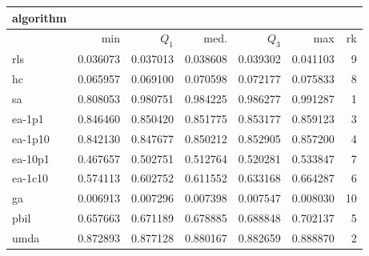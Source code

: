\begin{tabular}{@{}l*{5}{>{{}}N{1}{3}}>{{}}N{2}{0}@{}}
\toprule
{algorithm} &  \\
\midrule
& {min} & {$Q_1$} & {med.} & {$Q_3$} & {max} & {rk}\\
\midrule
rls & 0.036073 & 0.037013 & 0.038608 & 0.039302 & 0.041103 & 9\\
hc & 0.065957 & 0.069100 & 0.070598 & 0.072177 & 0.075833 & 8\\
sa & 0.808053 & {\color{blue}} 0.980751 & {\color{blue}} 0.984225 & {\color{blue}} 0.986277 & {\color{blue}} 0.991287 & 1\\
ea-1p1 & 0.846460 & 0.850420 & 0.851775 & 0.853177 & 0.859123 & 3\\
ea-1p10 & 0.842130 & 0.847677 & 0.850212 & 0.852905 & 0.857200 & 4\\
ea-10p1 & 0.467657 & 0.502751 & 0.512764 & 0.520281 & 0.533847 & 7\\
ea-1c10 & 0.574113 & 0.602752 & 0.611552 & 0.633168 & 0.664287 & 6\\
ga & 0.006913 & 0.007296 & 0.007398 & 0.007547 & 0.008030 & 10\\
pbil & 0.657663 & 0.671189 & 0.678885 & 0.688848 & 0.702137 & 5\\
umda & {\color{blue}} 0.872893 & 0.877128 & 0.880167 & 0.882659 & 0.888870 & 2\\
\bottomrule
\end{tabular}
